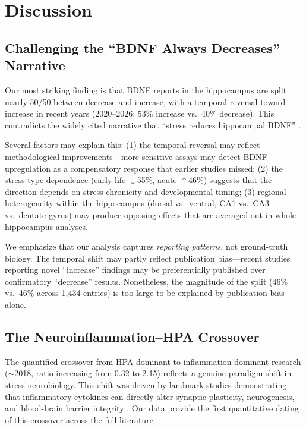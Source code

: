 \documentclass[12pt,a4paper]{article}
\begin{document}
\section{Discussion}

\subsection{Challenging the ``BDNF Always Decreases'' Narrative}

Our most striking finding is that BDNF reports in the hippocampus are split nearly 50/50 between decrease and increase, with a temporal reversal toward increase in recent years (2020--2026: 53\% increase vs.\ 40\% decrease). This contradicts the widely cited narrative that ``stress reduces hippocampal BDNF'' \citep{duman2006,smith2005}.

Several factors may explain this: (1) the temporal reversal may reflect methodological improvements---more sensitive assays may detect BDNF upregulation as a compensatory response that earlier studies missed; (2) the stress-type dependence (early-life $\downarrow$55\%, acute $\uparrow$46\%) suggests that the direction depends on stress chronicity and developmental timing; (3) regional heterogeneity within the hippocampus (dorsal vs.\ ventral, CA1 vs.\ CA3 vs.\ dentate gyrus) may produce opposing effects that are averaged out in whole-hippocampus analyses.

We emphasize that our analysis captures \textit{reporting patterns}, not ground-truth biology. The temporal shift may partly reflect publication bias---recent studies reporting novel ``increase'' findings may be preferentially published over confirmatory ``decrease'' results. Nonetheless, the magnitude of the split (46\% vs.\ 46\% across 1,434 entries) is too large to be explained by publication bias alone.

\subsection{The Neuroinflammation--HPA Crossover}

The quantified crossover from HPA-dominant to inflammation-dominant research ($\sim$2018, ratio increasing from 0.32 to 2.15) reflects a genuine paradigm shift in stress neurobiology. This shift was driven by landmark studies demonstrating that inflammatory cytokines can directly alter synaptic plasticity, neurogenesis, and blood-brain barrier integrity \citep{miller2016,wohleb2016}. Our data provide the first quantitative dating of this crossover across the full literature.
\end{document}
